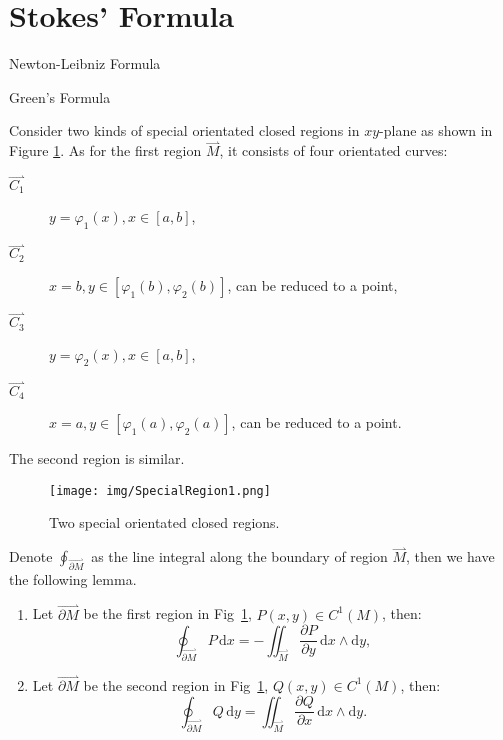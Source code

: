 \documentclass[11pt]{../../TexTemplate/elegantbook}
\begin{document}
\section{Stokes' Formula}
\begin{leftbarTitle}{Newton-Leibniz Formula}\end{leftbarTitle}

\begin{leftbarTitle}{Green's Formula}\end{leftbarTitle}
Consider two kinds of special orientated closed regions in \(xy\)-plane as shown in Figure \ref{fig:SpecialRegion1}.
As for the first region \(\overset{\rightharpoonup}{M}\), it consists of four orientated curves:
\begin{description}
    \item[\(\overset{\rightharpoonup}{C_1}\)] \(y = \varphi_{1}(x), x \in [a, b]\),
    \item[\(\overset{\rightharpoonup}{C_2}\)] \(x = b, y \in [\varphi_{1}(b), \varphi_{2}(b)]\), can be reduced to a point,
    \item[\(\overset{\rightharpoonup}{C_3}\)] \(y = \varphi_{2}(x), x \in [a, b]\),
    \item[\(\overset{\rightharpoonup}{C_4}\)] \(x = a, y \in [\varphi_{1}(a), \varphi_{2}(a)]\), can be reduced to a point.
\end{description}
The second region is similar.
\begin{figure}[h]
    \centering
    \texttt{[image: img/SpecialRegion1.png]}
    \caption{Two special orientated closed regions.}
    \label{fig:SpecialRegion1}
\end{figure}

Denote \(\oint_{\overset{\rightharpoonup}{\partial M}}\) as the line integral 
along the boundary of region \(\overset{\rightharpoonup}{M}\), then we have the following lemma.
\begin{lemma}
    \begin{enumerate}
        \item Let \(\overset{\rightharpoonup}{\partial M}\) be the first region in Fig~\ref{fig:SpecialRegion1},
            \(P(x, y) \in C^{1}(M)\), then:
            \[
            \oint_{\overset{\rightharpoonup}{\partial M}} P \, \mathrm{d}x = -\iint_{\overset{\rightharpoonup}{M}} \frac{\partial P}{\partial y} \, \mathrm{d}x \wedge \mathrm{d}y,
            \] 
        \item Let \(\overset{\rightharpoonup}{\partial M}\) be the second region in Fig~\ref{fig:SpecialRegion1},
            \(Q(x, y) \in C^{1}(M)\), then:
            \[
            \oint_{\overset{\rightharpoonup}{\partial M}} Q \, \mathrm{d}y = \iint_{\overset{\rightharpoonup}{M}} \frac{\partial Q}{\partial x} \, \mathrm{d}x \wedge \mathrm{d}y.
            \]
    \end{enumerate}
\end{lemma}
\end{document}
